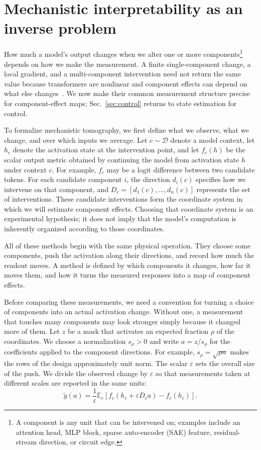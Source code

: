 \documentclass[sigconf,10pt,nonacm,balance=false]{acmart}
\newcommand{\eps}{\varepsilon}
\newcommand{\E}{\mathbb{E}}
\begin{document}
\section{Mechanistic interpretability as an inverse problem}\label{sec:formulation}

How much a model's output changes when we alter one or more components\footnote{A component is any unit that can be intervened on; examples include an attention head, MLP block, sparse auto-encoder (SAE) feature, residual-stream direction, or circuit edge.} depends on how we make the measurement. A finite single-component change, a local gradient, and a multi-component intervention need not return the same value because transformers are nonlinear and component effects can depend on what else changes~\cite{zhang2024patching,syed2024attrib,bair2026compressed}. We now make their common measurement structure precise for component-effect maps; Sec.~\ref{sec:control} returns to state estimation for control.

To formalize mechanistic tomography, we first define what we observe, what we change, and over which inputs we average. Let $c\sim\mathcal{D}$ denote a model context, let $h_c$ denote the activation state at the intervention point, and let $f_c(h)$ be the scalar output metric obtained by continuing the model from activation state $h$ under context $c$. For example, $f_c$ may be a logit difference between two candidate tokens. For each candidate component $i$, the direction $d_i(c)$ specifies how we intervene on that component, and $D_c=[d_1(c),\ldots,d_n(c)]$ represents the set of interventions. These candidate interventions form the coordinate system in which we will estimate component effects. Choosing that coordinate system is an experimental hypothesis; it does not imply that the model’s computation is inherently organized according to those coordinates.

All of these methods begin with the same physical operation. They choose some components, push the activation along their directions, and record how much the readout moves. A method is defined by which components it changes, how far it moves them, and how it turns the measured responses into a map of component effects.

Before comparing these measurements, we need a convention for turning a choice of components into an actual activation change. Without one, a measurement that touches many components may look stronger simply because it changed more of them. Let $z$ be a mask that activates an expected fraction $\rho$ of the coordinates. We choose a normalization $s_\rho>0$ and write $a=z/s_\rho$ for the coefficients applied to the component directions. For example, $s_\rho=\sqrt{\rho n}$ makes the rows of the design approximately unit norm. The scalar $\eps$ sets the overall size of the push. We divide the observed change by $\eps$ so that measurements taken at different scales are reported in the same units:
\begin{equation}
    \widetilde y(a) = \frac{1}{\eps}\E_c\left[f_c(h_c+\eps D_c a)-f_c(h_c)\right].
    \label{eq:finite}
\end{equation}
\end{document}
